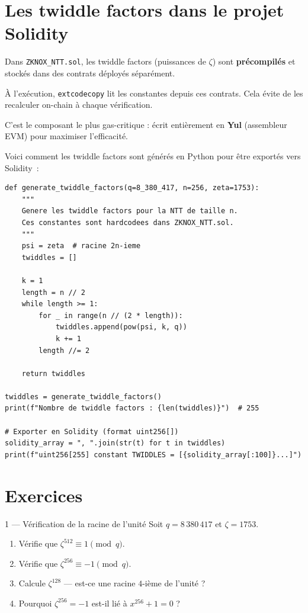 \documentclass[12pt, a4paper]{article}
\begin{document}
\section{Les twiddle factors dans le projet Solidity}

\begin{importantbox}
Dans \texttt{ZKNOX\_NTT.sol}, les twiddle factors (puissances de $\zeta$)
sont \textbf{précompilés} et stockés dans des contrats déployés séparément.

À l'exécution, \texttt{extcodecopy} lit les constantes depuis ces contrats.
Cela évite de les recalculer on-chain à chaque vérification.

C'est le composant le plus gas-critique : écrit entièrement en \textbf{Yul}
(assembleur EVM) pour maximiser l'efficacité.
\end{importantbox}

Voici comment les twiddle factors sont générés en Python pour être
exportés vers Solidity~:

\begin{lstlisting}[style=python]
def generate_twiddle_factors(q=8_380_417, n=256, zeta=1753):
    """
    Genere les twiddle factors pour la NTT de taille n.
    Ces constantes sont hardcodees dans ZKNOX_NTT.sol.
    """
    psi = zeta  # racine 2n-ieme
    twiddles = []

    k = 1
    length = n // 2
    while length >= 1:
        for _ in range(n // (2 * length)):
            twiddles.append(pow(psi, k, q))
            k += 1
        length //= 2

    return twiddles

twiddles = generate_twiddle_factors()
print(f"Nombre de twiddle factors : {len(twiddles)}")  # 255

# Exporter en Solidity (format uint256[])
solidity_array = ", ".join(str(t) for t in twiddles)
print(f"uint256[255] constant TWIDDLES = [{solidity_array[:100]}...]")
\end{lstlisting}

\section{Exercices}

\begin{exercice}{1 --- Vérification de la racine de l'unité}
Soit $q = 8\,380\,417$ et $\zeta = 1753$.
\begin{enumerate}[label=\alph*)]
  \item Vérifie que $\zeta^{512} \equiv 1 \pmod{q}$.
  \item Vérifie que $\zeta^{256} \equiv -1 \pmod{q}$.
  \item Calcule $\zeta^{128}$ --- est-ce une racine $4$-ième de l'unité ?
  \item Pourquoi $\zeta^{256} = -1$ est-il lié à $x^{256} + 1 = 0$ ?
\end{enumerate}
\end{exercice}
\end{document}
